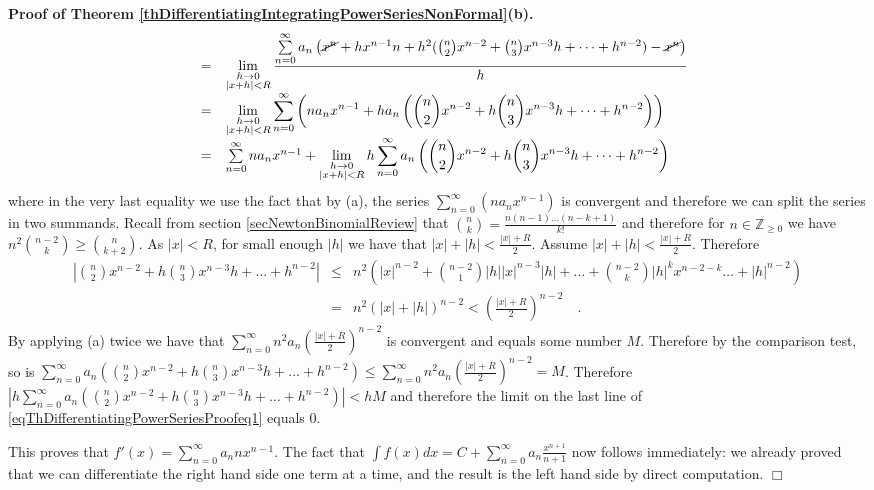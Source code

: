 \documentclass[12pt]{book}
\newenvironment{proof}[1][]{ \textbf{Proof#1.} }{$\Box$\medskip}
\begin{document}
\begin{itemize}
\begin{proof}[ of Theorem \ref{thDifferentiatingIntegratingPowerSeriesNonFormal}(b)]
\begin{equation}
\begin{array}{rcl}
&=& \displaystyle\lim\limits_{\substack{h\to 0\\|x+h|<R}} \frac{\sum\limits_{n=0}^{\infty} a_n\left( \cancel {x^n}+ hx^{n-1}n+ h^2(\binom{n}{2} x^{n-2}+\binom{n}{3} x^{n-3}h+\dots +h^{n-2})-  \cancel{x^n}\right) }{h}
\\
&=&\displaystyle\lim\limits_{\substack{h\to 0\\|x+h|<R}} \sum\limits_{n=0}^{\infty}\left(na_n x^{n-1}  +ha_n\left(\binom{n}{2} x^{n-2}+h\binom{n}{3}x^{n-3}h+\dots +h^{n-2}\right) \right)\\
&=&\sum\limits_{n=0}^{\infty}na_n x^{n-1}  +\displaystyle\lim\limits_{\substack{h\to 0\\|x+h|<R}}h\sum\limits_{n=0}^{\infty} a_n\left(\binom{n}{2} x^{n-2}+h\binom{n}{3}x^{n-3}h+\dots +h^{n-2}\right) 
\end{array}
\end{equation}
where in the very last equality we use the fact that by (a), the series $\sum\limits_{n=0}^{\infty}\left(na_n x^{n-1}\right)$ is convergent and therefore we can split the series in two summands. Recall from section \ref{secNewtonBinomialReview} that $\binom{n }{k}= \frac{n(n-1)\dots (n-k+1)}{k!}$ and therefore for $n\in \mathbb Z_{\geq 0}$ we have $n^2\binom{n-2}{k}\geq\binom{n}{k+2}$. As $|x|<R$, for small enough $|h|$ we have that $|x|+|h|<\frac{|x|+R}{2}$. Assume $|x|+|h|<\frac{|x|+R}{2}$. Therefore 
\[\begin{array}{rcl}
\left|\binom{n}{2} x^{n-2}+h\binom{n}{3}x^{n-3}h+\dots +h^{n-2}\right|&\leq&  n^2\left( |x|^{n-2}+
\binom{n-2}{1}|h||x|^{n-3}|h|+\dots+\binom{n-2}{k}|h|^kx^{n-2-k} \dots +|h|^{n-2}\right) \\
&=&n^2 (|x|+|h|)^{n-2}<\left(\frac{|x|+R}{2}\right)^{n-2}\quad .
\end{array}
\]
By applying (a) twice we have that $\sum\limits_{n=0}^{\infty} n^2a_n\left(\frac{|x|+R}{2}\right)^{n-2} $ is convergent and equals some number $M$. Therefore by the comparison test, so is $\sum\limits_{n=0}^{\infty} a_n\left(\binom{n}{2} x^{n-2}+h\binom{n}{3}x^{n-3}h+\dots +h^{n-2}\right)\leq \sum\limits_{n=0}^{\infty} n^2a_n\left(\frac{|x|+R}{2}\right)^{n-2}=M$. Therefore $|h\sum\limits_{n=0}^{\infty} a_n\left(\binom{n}{2} x^{n-2}+h\binom{n}{3}x^{n-3}h+\dots +h^{n-2}\right)|<h M$ and therefore the limit on the last line of \eqref{eqThDifferentiatingPowerSeriesProofeq1} equals 0.

This proves that $f'(x)=\sum\limits_{n=0}^\infty a_n n x^{n-1}$. The fact that $\displaystyle\int f(x)dx= C+\sum\limits_{n=0}^\infty a_n\frac{x^{n+1}}{n+1} $ now follows immediately: we already proved that we can differentiate the right hand side one term at a time, and the result is the left hand side by direct computation.
\end{proof}


\end{itemize}
\end{document}
